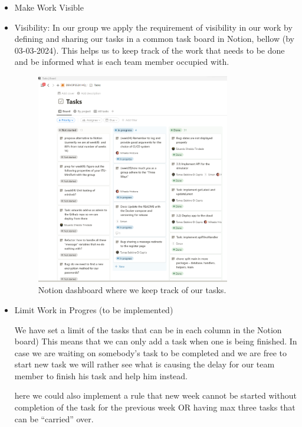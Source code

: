 \documentclass{article}
\begin{document}
\begin{itemize}

\item Make Work Visible
  \item Visibility:  In our group we apply the requirement of visibility in our work by defining and sharing our tasks in a common task board in Notion, bellow (by 03-03-2024). This helps us to keep track of the work that needs to be done and be informed what is each team member occupied with.

\begin{figure}[ht]
    \centering
    \includegraphics[width=0.8\textwidth]{./images/notion-dashboard-visibility-three-ways.png}
    \caption{Notion dashboard where we keep track of our tasks.}
    \label{fig:notion-dashboard}
\end{figure}
    
\item Limit Work in Progres
(to be implemented)

We have set a limit of the tasks  that can  be in each column in the Notion board) This means that we can only add a task when one is being finished. In case we are waiting on somebody’s task to be completed and we are free to start new task we will rather see what is causing the delay for our team member to finish his task and help him instead. 

here we could also implement a rule that new week cannot be started without completion of the task for the previous week OR having max three tasks that can be “carried” over.


\end{itemize}
\end{document}
